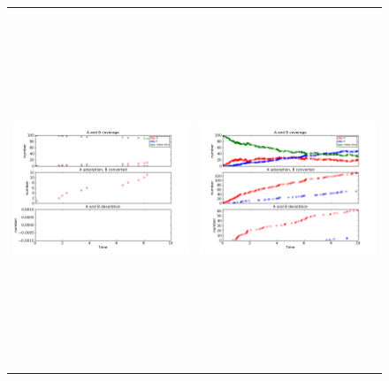 \documentclass[11pt]{article}
\begin{document}
\setlength{\unitlength}{1in}
\begin{figure}[h!]
\begin{tabular}{cc}
\includegraphics[width=3.5in, height=4.2in]{./coadsorb_irreversible/AtoBirreversible10x10_101_Bdes2x_EA5E3_EBx10E3_3.png} &
\includegraphics[width=3.5in, height=4.2in]{./coadsorb_irreversible/AtoBirreversible10x10_201_Bdes2x_EA5E3_EBx10E3_3.png} \\

\end{tabular}
\end{figure}
\end{document}
